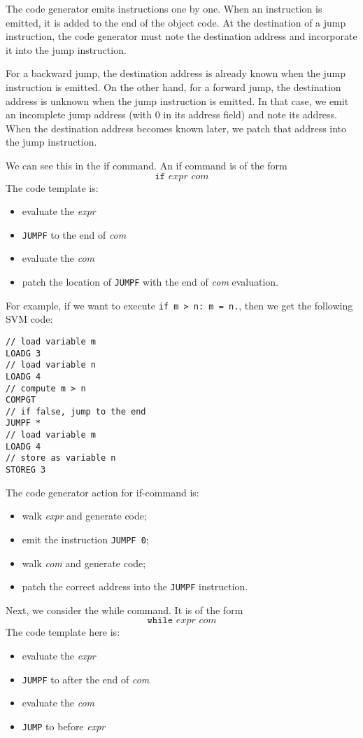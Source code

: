 \documentclass[a4paper, openany]{memoir}
\begin{document}
The code generator emits instructions one by one. When an instruction is emitted, it is added to the end of the object code. At the destination of a jump instruction, the code generator must note the destination address and incorporate it into the jump instruction.

For a backward jump, the destination address is already known when the jump instruction is emitted. On the other hand, for a forward jump, the destination address is unknown when the jump instruction is emitted. In that case, we emit an incomplete jump address (with 0 in its address field) and note its address. When the destination address becomes known later, we patch that address into the jump instruction.

We can see this in the if command. An if command is of the form
\[\texttt{if } \textit{expr } \textit{com}\]
The code template is:
\begin{itemize}
    \item evaluate the \textit{expr}
    \item \texttt{JUMPF} to the end of \textit{com}
    \item evaluate the \textit{com}
    \item patch the location of \texttt{JUMPF} with the end of \textit{com} evaluation.
\end{itemize}
For example, if we want to execute \texttt{if m > n: m = n.}, then we get the following SVM code:
\begin{lstlisting}[language=SVM]
// load variable m
LOADG 3
// load variable n
LOADG 4
// compute m > n
COMPGT
// if false, jump to the end
JUMPF *
// load variable m
LOADG 4
// store as variable n
STOREG 3
\end{lstlisting}
The code generator action for if-command is:
\begin{itemize}
    \item walk \textit{expr} and generate code;
    \item emit the instruction \texttt{JUMPF 0};
    \item walk \textit{com} and generate code;
    \item patch the correct address into the \texttt{JUMPF} instruction.
\end{itemize}

Next, we consider the while command. It is of the form
\[\texttt{while} \textit{ expr com}\]
The code template here is:
\begin{itemize}
    \item evaluate the \textit{expr}
    \item \texttt{JUMPF} to after the end of \textit{com}
    \item evaluate the \textit{com}
    \item \texttt{JUMP} to before \textit{expr}
\end{itemize}
\end{document}
